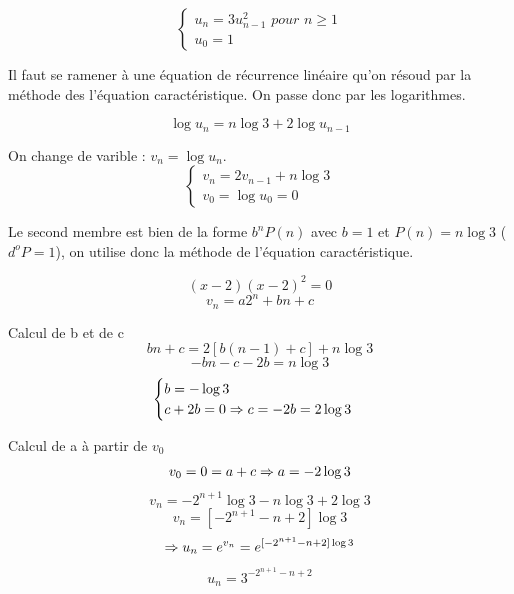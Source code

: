 \begin{exercice}

\[ \begin{cases} u_n=3u_{n-1}^2 \textit{ pour } n \ge 1 \\ u_0=1 \end{cases} \]

Il faut se ramener à une équation de récurrence linéaire qu'on résoud par la méthode des l'équation caractéristique. On passe donc par les logarithmes.

\[ \log u_n =n\log 3+2\log u_{n-1} \]

On change de varible : $v_n=\log u_n$.
\[ \begin{cases} v_n=2v_{n-1}+n\log 3 \\
v_0=\log u_0=0 \end{cases} \]

Le second membre est bien de la forme $b^nP(n)$ avec $b=1$ et $P(n)=n\log 3$ ($d^o P=1$), on utilise donc la méthode de l'équation caractéristique.

\[ (x-2)(x-2)^2=0 \]
\[ v_n=a2^n+bn+c \]

Calcul de b et de c
\[ bn+c=2[b(n-1)+c]+n\log 3 \]
\[ -bn-c-2b=n\log 3\]
\[ \begin{cases} b=-\log 3 \\ c+2b=0 \Rightarrow c=-2b=2\log 3 \end{cases} \]

Calcul de a à partir de $v_0$
\[ v_0=0=a+c \Rightarrow a=-2\log 3 \]
\[ v_n=-2^{n+1}\log 3-n\log 3+2\log3 \]
\[ v_n=[-2^{n+1}-n+2]\log 3 \]
\[ \Rightarrow u_n=e^{v_n}=e^{[-2^{n+1}-n+2]\log 3} \]
\[ u_n=3^{-2^{n+1}-n+2} \]

\end{exercice}


